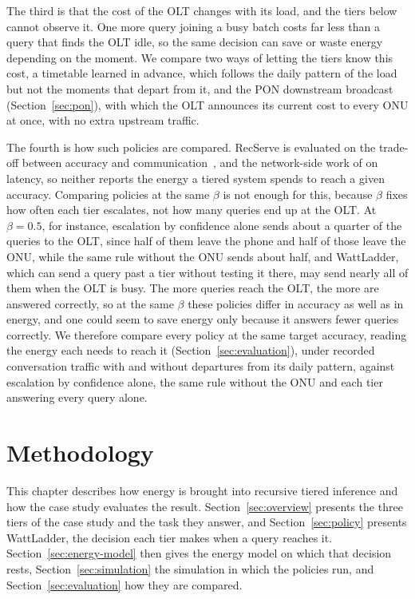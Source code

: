 \documentclass[cic,dipl,english]{infufrgs}
\begin{document}
The third is that the cost of the OLT changes with its load, and the tiers below cannot
observe it. One more query joining a busy batch costs far less than a query that finds
the OLT idle, so the same decision can save or waste energy depending on the moment. We
compare two ways of letting the tiers know this cost, a timetable learned in advance, which
follows the daily pattern of the load but not the moments that depart from it, and the PON
downstream broadcast (Section~\ref{sec:pon}), with which the OLT announces its current cost to
every ONU at once, with no extra upstream traffic.

The fourth is how such policies are compared. RecServe is evaluated on the trade-off
between accuracy and communication~\cite{wu2025recserve}, and the network-side work of
 on latency, so neither reports the energy a tiered
system spends to reach a given accuracy. Comparing policies at the same $\beta$ is not
enough for this, because $\beta$ fixes how often each tier escalates, not how many queries
end up at the OLT. At $\beta = 0.5$, for instance, escalation by confidence alone sends
about a quarter of the queries to the OLT, since half of them leave the phone and half of
those leave the ONU, while the same rule without the ONU sends about half, and WattLadder,
which can send a query past a tier without testing it there, may send nearly all of them
when the OLT is busy. The more queries reach the OLT, the more are answered correctly, so at
the same $\beta$ these policies differ in accuracy as well as in energy, and one could seem
to save energy only because it answers fewer queries correctly. We therefore compare every
policy at the same target accuracy, reading the energy each needs to reach it
(Section~\ref{sec:evaluation}), under recorded
conversation traffic with and without departures from its daily pattern, against
escalation by confidence alone, the same rule without the ONU and each tier answering every
query alone.

\chapter{Methodology}
\label{chap:methodology}

This chapter describes how energy is brought into recursive tiered inference and how the
case study evaluates the result. Section~\ref{sec:overview} presents the three tiers of
the case study and the task they answer, and Section~\ref{sec:policy} presents WattLadder,
the decision each tier makes when a query reaches it. Section~\ref{sec:energy-model} then gives the energy
model on which that decision rests, Section~\ref{sec:simulation} the simulation in which
the policies run, and Section~\ref{sec:evaluation} how they are compared.
\end{document}
